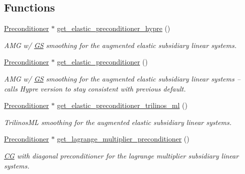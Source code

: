 \subsection*{Functions}
\begin{DoxyCompactItemize}
\item 
\hyperlink{classoomph_1_1Preconditioner}{Preconditioner} $\ast$ \hyperlink{namespaceoomph_1_1Pseudo__Elastic__Preconditioner__Subsidiary__Operator__Helper_aedfcfd828b599566ad795d22850a6960}{get\+\_\+elastic\+\_\+preconditioner\+\_\+hypre} ()
\begin{DoxyCompactList}\small\item\em A\+MG w/ \hyperlink{classoomph_1_1GS}{GS} smoothing for the augmented elastic subsidiary linear systems. \end{DoxyCompactList}\item 
\hyperlink{classoomph_1_1Preconditioner}{Preconditioner} $\ast$ \hyperlink{namespaceoomph_1_1Pseudo__Elastic__Preconditioner__Subsidiary__Operator__Helper_a89297aa38d1b277fe3db3c0281aa4924}{get\+\_\+elastic\+\_\+preconditioner} ()
\begin{DoxyCompactList}\small\item\em A\+MG w/ \hyperlink{classoomph_1_1GS}{GS} smoothing for the augmented elastic subsidiary linear systems -- calls Hypre version to stay consistent with previous default. \end{DoxyCompactList}\item 
\hyperlink{classoomph_1_1Preconditioner}{Preconditioner} $\ast$ \hyperlink{namespaceoomph_1_1Pseudo__Elastic__Preconditioner__Subsidiary__Operator__Helper_ac5df49cd5860e1cd611fa73cc0f60bc6}{get\+\_\+elastic\+\_\+preconditioner\+\_\+trilinos\+\_\+ml} ()
\begin{DoxyCompactList}\small\item\em Trilinos\+ML smoothing for the augmented elastic subsidiary linear systems. \end{DoxyCompactList}\item 
\hyperlink{classoomph_1_1Preconditioner}{Preconditioner} $\ast$ \hyperlink{namespaceoomph_1_1Pseudo__Elastic__Preconditioner__Subsidiary__Operator__Helper_a00a15f5ea18cab0665797ba03a9c9286}{get\+\_\+lagrange\+\_\+multiplier\+\_\+preconditioner} ()
\begin{DoxyCompactList}\small\item\em \hyperlink{classoomph_1_1CG}{CG} with diagonal preconditioner for the lagrange multiplier subsidiary linear systems. \end{DoxyCompactList}\end{DoxyCompactItemize}


